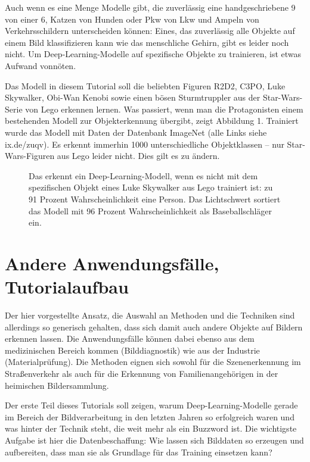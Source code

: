 Auch wenn es eine Menge Modelle gibt, die zuverlässig eine handgeschriebene 9 von einer 6, Katzen von Hunden oder Pkw von Lkw und Ampeln von Verkehrsschildern unterscheiden können: Eines, das zuverlässig alle Objekte auf einem Bild klassifizieren kann wie das menschliche Gehirn, gibt es leider noch nicht. Um Deep-Learning-Modelle auf spezifische Objekte zu trainieren, ist etwas Aufwand vonnöten. 

Das Modell in diesem Tutorial soll die beliebten Figuren R2D2, C3PO, Luke Skywalker, Obi-Wan Kenobi sowie einen bösen Sturmtruppler aus der Star-Wars-Serie von Lego erkennen lernen. Was passiert, wenn man die Protagonisten einem bestehenden Modell zur Objekterkennung übergibt, zeigt Abbildung 1. Trainiert wurde das Modell mit Daten der Datenbank Image­Net (alle Links siehe ix.de/zuqv). Es erkennt immerhin 1000 unterschiedliche Objektklassen – nur Star-Wars-Figuren aus Lego leider nicht. Dies gilt es zu ändern. 

\begin{figure}
	\caption{Das erkennt ein Deep-Learning-Modell, wenn es nicht mit dem spezifischen Objekt eines Luke Skywalker aus Lego trainiert ist: zu 91 Prozent Wahrscheinlichkeit eine Person. Das Lichtschwert sortiert das Modell mit 96 Prozent Wahrscheinlichkeit als Baseballschläger ein.}
\end{figure}	

\section{Andere Anwendungsfälle, Tutorialaufbau}

Der hier vorgestellte Ansatz, die Auswahl an Methoden und die Techniken sind allerdings so generisch gehalten, dass sich damit auch andere Objekte auf Bildern erkennen lassen. Die Anwendungsfälle können dabei ebenso aus dem medizinischen Bereich kommen (Bilddiagnostik) wie aus der Industrie (Materialprüfung). Die Methoden eignen sich sowohl für die Szenenerkennung im Straßenverkehr als auch für die Erkennung von Familienangehörigen in der heimischen Bildersammlung. 

Der erste Teil dieses Tutorials soll zeigen, warum Deep-Learning-Modelle gerade im Bereich der Bildverarbeitung in den letzten Jahren so erfolgreich waren und was hinter der Technik steht, die weit mehr als ein Buzzword ist. Die wichtigste Aufgabe ist hier die Datenbeschaffung: Wie lassen sich Bilddaten so erzeugen und aufbereiten, dass man sie als Grundlage für das Training einsetzen kann? 

